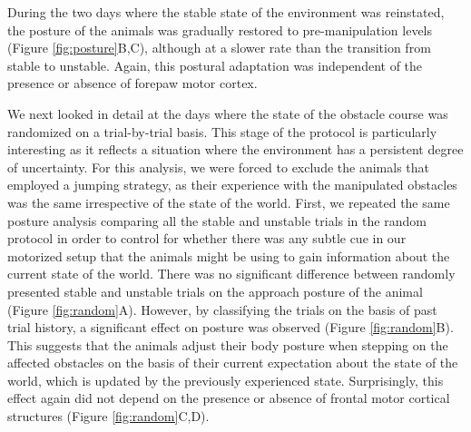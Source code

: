 During the two days where the stable state of the environment was reinstated, the posture of the animals was gradually restored to pre-manipulation levels (Figure \ref{fig:posture}B,C), although at a slower rate than the transition from stable to unstable. Again, this postural adaptation was independent of the presence or absence of forepaw motor cortex.

We next looked in detail at the days where the state of the obstacle course was randomized on a trial-by-trial basis. This stage of the protocol is particularly interesting as it reflects a situation where the environment has a persistent degree of uncertainty. For this analysis, we were forced to exclude the animals that employed a jumping strategy, as their experience with the manipulated obstacles was the same irrespective of the state of the world. First, we repeated the same posture analysis comparing all the stable and unstable trials in the random protocol in order to control for whether there was any subtle cue in our motorized setup that the animals might be using to gain information about the current state of the world. There was no significant difference between randomly presented stable and unstable trials on the approach posture of the animal (Figure \ref{fig:random}A). However, by classifying the trials on the basis of past trial history, a significant effect on posture was observed (Figure \ref{fig:random}B). This suggests that the animals adjust their body posture when stepping on the affected obstacles on the basis of their current expectation about the state of the world, which is updated by the previously experienced state. Surprisingly, this effect again did not depend on the presence or absence of frontal motor cortical structures (Figure \ref{fig:random}C,D).

